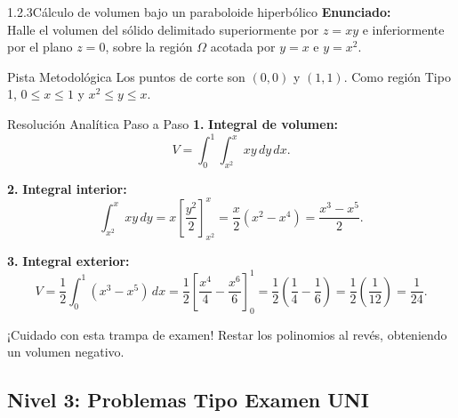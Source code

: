 \documentclass[11pt,a4paper]{article}
\begin{document}
\begin{nivelbox}{1.2.3}{Cálculo de volumen bajo un paraboloide hiperbólico}
\textbf{Enunciado:}\\
Halle el volumen del sólido delimitado superiormente por $z = x y$ e inferiormente por el plano $z = 0$, sobre la región $\Omega$ acotada por $y = x$ e $y = x^2$.

\begin{observacionbox}{Pista Metodológica}
Los puntos de corte son $(0,0)$ y $(1,1)$. Como región Tipo 1, $0 \le x \le 1$ y $x^2 \le y \le x$.
\end{observacionbox}

\begin{ejerciciobox}{Resolución Analítica Paso a Paso}
\smallskip\noindent\textbf{1.} \textbf{Integral de volumen:}
\[V = \int_0^1 \int_{x^2}^x x y \, dy \, dx.\]

\smallskip\noindent\textbf{2.} \textbf{Integral interior:}
\[\int_{x^2}^x x y \, dy = x \left[ \frac{y^2}{2} \right]_{x^2}^x = \frac{x}{2} (x^2 - x^4) = \frac{x^3 - x^5}{2}.\]

\smallskip\noindent\textbf{3.} \textbf{Integral exterior:}
\[V = \frac{1}{2} \int_0^1 (x^3 - x^5) \, dx = \frac{1}{2} \left[ \frac{x^4}{4} - \frac{x^6}{6} \right]_0^1 = \frac{1}{2} \left( \frac{1}{4} - \frac{1}{6} \right) = \frac{1}{2} \left( \frac{1}{12} \right) = \frac{1}{24}.\]
\end{ejerciciobox}

\begin{errorbox}{¡Cuidado con esta trampa de examen!}
Restar los polinomios al revés, obteniendo un volumen negativo.
\end{errorbox}
\end{nivelbox}
\bigskip

\subsection{Nivel 3: Problemas Tipo Examen UNI}
\end{document}
